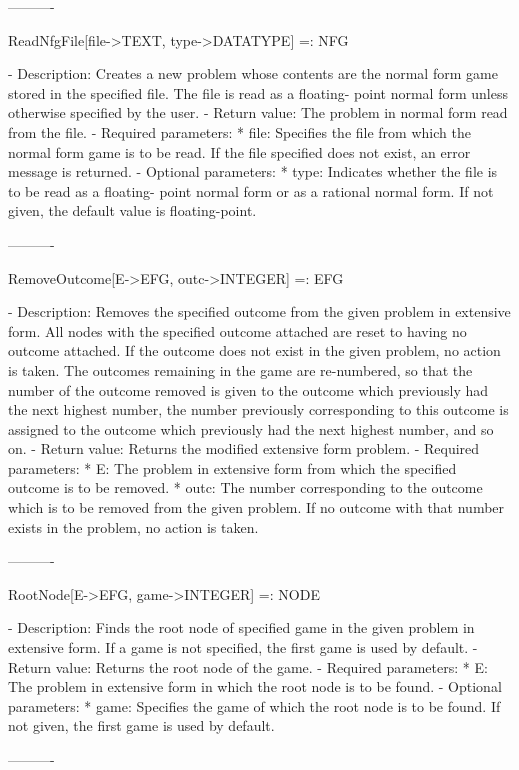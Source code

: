 ----------

ReadNfgFile[file->TEXT, {type->DATATYPE}] =: NFG

   -	Description:  Creates a new problem whose contents are the normal form
	game stored in the specified file.  The file is read as a floating-
	point normal form unless otherwise specified by the user.
   -	Return value:  The problem in normal form read from the file.
   -	Required parameters:
	  *  file:  Specifies the file from which the normal form game is to be
		read.  If the file specified does not exist, an error message
		is returned.
   -	Optional parameters:
	  *  type:  Indicates whether the file is to be read as a floating-
		point normal form or as a rational normal form.  If not given,
		the default value is floating-point.

----------

RemoveOutcome[E->EFG, outc->INTEGER] =: EFG

   -	Description:  Removes the specified outcome from the given problem in
	extensive form.  All nodes with the specified outcome attached are 
	reset to having no outcome attached.  If the outcome does not exist in
	the given problem, no action is taken.  The outcomes remaining in the 
	game are re-numbered, so that the number of the outcome removed is 
	given to the outcome which previously had the next highest number, the
	number previously corresponding to this outcome is assigned to the
	outcome which previously had the next highest number, and so on.  
   -	Return value:  Returns the modified extensive form problem.
   -	Required parameters:
	  *  E:  The problem in extensive form from which the specified outcome
		is to be removed.
	  *  outc:  The number corresponding to the outcome which is to be 
		removed from the given problem.  If no outcome with that number
		exists in the problem, no action is taken.

----------

RootNode[E->EFG, {game->INTEGER}] =: NODE

   -	Description:  Finds the root node of specified game in the given 
	problem in extensive form.  If a game is not specified, the first game 
	is used by default.
   -	Return value:  Returns the root node of the game.
   -	Required parameters:
	  *  E:  The problem in extensive form in which the root node is to be
		found.
   -	Optional parameters:
	  *  game:  Specifies the game of which the root node is to be found.
		If not given, the first game is used by default.

----------


